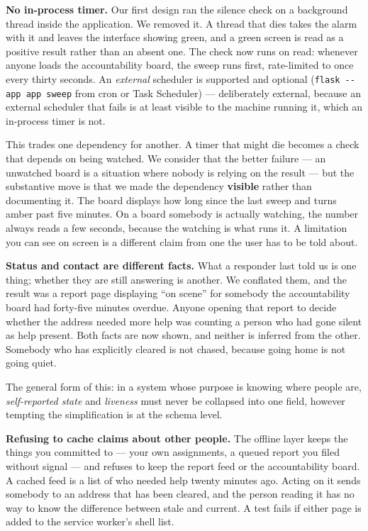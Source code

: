 \textbf{No in-process timer.} Our first design ran the silence check on
a background thread inside the application. We removed it. A thread that
dies takes the alarm with it and leaves the interface showing green, and
a green screen is read as a positive result rather than an absent one.
The check now runs on read: whenever anyone loads the accountability
board, the sweep runs first, rate-limited to once every thirty seconds.
An \emph{external} scheduler is supported and optional
(\texttt{flask\ -\/-app\ app\ sweep} from cron or Task Scheduler) ---
deliberately external, because an external scheduler that fails is at
least visible to the machine running it, which an in-process timer is
not.

This trades one dependency for another. A timer that might die becomes a
check that depends on being watched. We consider that the better failure
--- an unwatched board is a situation where nobody is relying on the
result --- but the substantive move is that we made the dependency
\textbf{visible} rather than documenting it. The board displays how long
since the last sweep and turns amber past five minutes. On a board
somebody is actually watching, the number always reads a few seconds,
because the watching is what runs it. A limitation you can see on screen
is a different claim from one the user has to be told about.

\textbf{Status and contact are different facts.} What a responder last
told us is one thing; whether they are still answering is another. We
conflated them, and the result was a report page displaying ``on scene''
for somebody the accountability board had forty-five minutes overdue.
Anyone opening that report to decide whether the address needed more
help was counting a person who had gone silent as help present. Both
facts are now shown, and neither is inferred from the other. Somebody
who has explicitly cleared is not chased, because going home is not
going quiet.

The general form of this: in a system whose purpose is knowing where
people are, \emph{self-reported state} and \emph{liveness} must never be
collapsed into one field, however tempting the simplification is at the
schema level.

\textbf{Refusing to cache claims about other people.} The offline layer
keeps the things you committed to --- your own assignments, a queued
report you filed without signal --- and refuses to keep the report feed
or the accountability board. A cached feed is a list of who needed help
twenty minutes ago. Acting on it sends somebody to an address that has
been cleared, and the person reading it has no way to know the
difference between stale and current. A test fails if either page is
added to the service worker's shell list.

